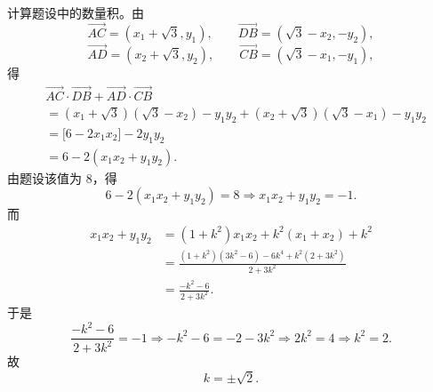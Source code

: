 \begin{answer}
计算题设中的数量积。由
\nopagebreak[4]
\[\overrightarrow{AC}=(x_1+\sqrt3,y_1),\qquad
\overrightarrow{DB}=(\sqrt3-x_2,-y_2),\]
\nopagebreak[4]
\[\overrightarrow{AD}=(x_2+\sqrt3,y_2),\qquad
\overrightarrow{CB}=(\sqrt3-x_1,-y_1),\]
得
\nopagebreak[4]
\[\begin{aligned}
&\overrightarrow{AC}\cdot\overrightarrow{DB}
+\overrightarrow{AD}\cdot\overrightarrow{CB}\\
&=(x_1+\sqrt3)(\sqrt3-x_2)-y_1y_2
+(x_2+\sqrt3)(\sqrt3-x_1)-y_1y_2\\
&=\bigl[6-2x_1x_2\bigr]-2y_1y_2\\
&=6-2(x_1x_2+y_1y_2).
\end{aligned}\]
由题设该值为 $8$，得
\nopagebreak[4]
\[6-2(x_1x_2+y_1y_2)=8
\Longrightarrow x_1x_2+y_1y_2=-1.\]
而
\nopagebreak[4]
\[\begin{aligned}
x_1x_2+y_1y_2
&=(1+k^2)x_1x_2+k^2(x_1+x_2)+k^2\\
&=\frac{(1+k^2)(3k^2-6)-6k^4+k^2(2+3k^2)}{2+3k^2}\\
&=\frac{-k^2-6}{2+3k^2}.
\end{aligned}\]
于是
\nopagebreak[4]
\[\frac{-k^2-6}{2+3k^2}=-1
\Longrightarrow -k^2-6=-2-3k^2
\Longrightarrow 2k^2=4
\Longrightarrow k^2=2.\]
故
\nopagebreak[4]
\[k=\pm\sqrt2.\]



\end{answer}

